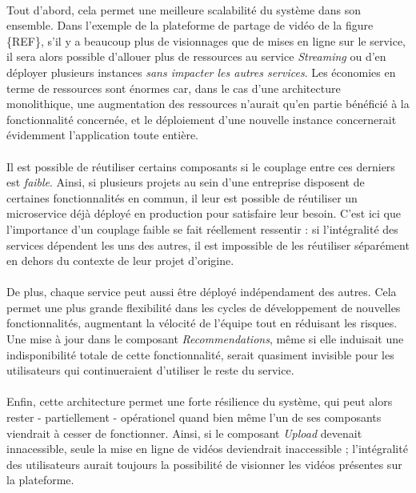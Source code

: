 \paragraph{} Tout d'abord, cela permet une meilleure scalabilité du système dans son ensemble. Dans l'exemple de la plateforme
de partage de vidéo de la figure \{REF\}, s'il y a beaucoup plus de visionnages que de mises en 
ligne sur le service, il sera alors possible d'allouer plus de ressources au service \emph{Streaming} ou d'en déployer
plusieurs instances \emph{sans impacter les autres services}. Les économies en terme de ressources sont énormes car, dans 
le cas d'une architecture monolithique, une augmentation des ressources n'aurait qu'en partie bénéficié à la fonctionnalité 
concernée, et le déploiement d'une nouvelle instance concernerait évidemment l'application toute entière.

\paragraph{} Il est possible de réutiliser certains composants si le couplage entre ces derniers est \emph{faible}.
Ainsi, si plusieurs projets au sein d'une entreprise disposent de certaines fonctionnalités en commun, il leur est possible 
de réutiliser un microservice déjà déployé en production pour satisfaire leur besoin. C'est ici que l'importance d'un couplage
faible se fait réellement ressentir : si l'intégralité des services dépendent les uns des autres, il est impossible de les
réutiliser séparément en dehors du contexte de leur projet d'origine.

\paragraph{} De plus, chaque service peut aussi être déployé indépendament des autres. Cela permet une plus grande flexibilité dans
les cycles de développement de nouvelles fonctionnalités, augmentant la vélocité de l'équipe tout en réduisant les risques.
Une mise à jour dans le composant \emph{Recommendations}, même si elle induisait une indisponibilité totale de cette fonctionnalité,
serait quasiment invisible pour les utilisateurs qui continueraient d'utiliser le reste du service.

\paragraph{} Enfin, cette architecture permet une forte résilience du système, qui peut alors rester - partiellement - 
opérationel quand bien même l'un de ses composants viendrait à cesser de fonctionner. Ainsi, si le composant \emph{Upload}
devenait innacessible, seule la mise en ligne de vidéos deviendrait inaccessible ; l'intégralité des utilisateurs aurait
toujours la possibilité de visionner les vidéos présentes sur la plateforme.

